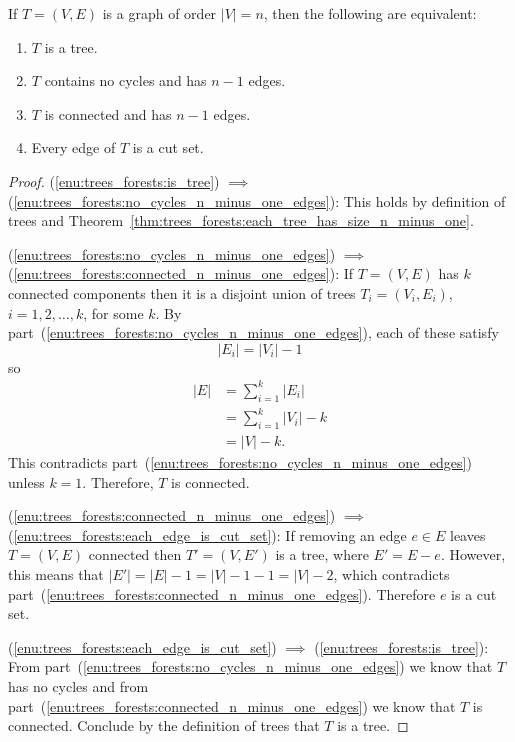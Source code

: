 \begin{corollary}
If $T = (V,E)$ is a graph of order $|V| = n$, then the following are
equivalent:
\begin{enumerate}
\item\label{enu:trees_forests:is_tree} $T$ is a tree.

\item\label{enu:trees_forests:no_cycles_n_minus_one_edges} $T$
  contains no cycles and has $n - 1$ edges.

\item\label{enu:trees_forests:connected_n_minus_one_edges} $T$ is
  connected and has $n - 1$ edges.

\item\label{enu:trees_forests:each_edge_is_cut_set} Every edge of $T$
  is a cut set.
\end{enumerate}
\end{corollary}

\begin{proof}
(\ref{enu:trees_forests:is_tree}) $\implies$
  (\ref{enu:trees_forests:no_cycles_n_minus_one_edges}):
This holds by definition of trees and
Theorem~\ref{thm:trees_forests:each_tree_has_size_n_minus_one}.

(\ref{enu:trees_forests:no_cycles_n_minus_one_edges}) $\implies$
(\ref{enu:trees_forests:connected_n_minus_one_edges}):
If $T = (V,E)$ has $k$ connected components then it is a disjoint
union of trees $T_i = (V_i, E_i)$, $i = 1, 2, \dots, k$, for some
$k$. By part~(\ref{enu:trees_forests:no_cycles_n_minus_one_edges}),
each of these satisfy
\[
|E_i|
=
|V_i| - 1
\]
so
\begin{align*}
|E|
&=
\sum_{i=1}^k |E_i| \\[4pt]
&=
\sum_{i=1}^k |V_i| - k \\[4pt]
&=
|V| - k.
\end{align*}
This contradicts
part~(\ref{enu:trees_forests:no_cycles_n_minus_one_edges}) unless
$k = 1$. Therefore, $T$ is connected.

(\ref{enu:trees_forests:connected_n_minus_one_edges}) $\implies$
(\ref{enu:trees_forests:each_edge_is_cut_set}):
If removing an edge $e \in E$ leaves $T = (V,E)$ connected then
$T' = (V, E')$ is a tree, where $E' = E - e$. However, this means that
$|E'| = |E| - 1 = |V| - 1 - 1 = |V| - 2$, which contradicts
part~(\ref{enu:trees_forests:connected_n_minus_one_edges}). Therefore
$e$ is a cut set.

(\ref{enu:trees_forests:each_edge_is_cut_set}) $\implies$
(\ref{enu:trees_forests:is_tree}):
From part~(\ref{enu:trees_forests:no_cycles_n_minus_one_edges}) we
know that $T$ has no cycles and from
part~(\ref{enu:trees_forests:connected_n_minus_one_edges}) we know
that $T$ is connected. Conclude by the definition of trees that $T$ is
a tree.
\end{proof}

